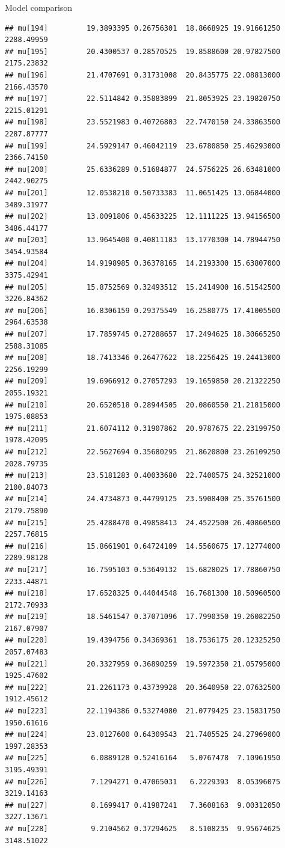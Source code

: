 \documentclass[
  ignorenonframetext,
]{beamer}
\begin{document}
\begin{frame}[fragile]{Model comparison}
\begin{verbatim}
## mu[194]         19.3893395 0.26756301  18.8668925 19.91661250 2288.49959
## mu[195]         20.4300537 0.28570525  19.8588600 20.97827500 2175.23832
## mu[196]         21.4707691 0.31731008  20.8435775 22.08813000 2166.43570
## mu[197]         22.5114842 0.35883899  21.8053925 23.19820750 2215.01291
## mu[198]         23.5521983 0.40726803  22.7470150 24.33863500 2287.87777
## mu[199]         24.5929147 0.46042119  23.6780850 25.46293000 2366.74150
## mu[200]         25.6336289 0.51684877  24.5756225 26.63481000 2442.90275
## mu[201]         12.0538210 0.50733383  11.0651425 13.06844000 3489.31977
## mu[202]         13.0091806 0.45633225  12.1111225 13.94156500 3486.44177
## mu[203]         13.9645400 0.40811183  13.1770300 14.78944750 3454.93584
## mu[204]         14.9198985 0.36378165  14.2193300 15.63807000 3375.42941
## mu[205]         15.8752569 0.32493512  15.2414900 16.51542500 3226.84362
## mu[206]         16.8306159 0.29375549  16.2580775 17.41005500 2964.63538
## mu[207]         17.7859745 0.27288657  17.2494625 18.30665250 2588.31085
## mu[208]         18.7413346 0.26477622  18.2256425 19.24413000 2256.19299
## mu[209]         19.6966912 0.27057293  19.1659850 20.21322250 2055.19321
## mu[210]         20.6520518 0.28944505  20.0860550 21.21815000 1975.08853
## mu[211]         21.6074112 0.31907862  20.9787675 22.23199750 1978.42095
## mu[212]         22.5627694 0.35680295  21.8620800 23.26109250 2028.79735
## mu[213]         23.5181283 0.40033680  22.7400575 24.32521000 2100.84073
## mu[214]         24.4734873 0.44799125  23.5908400 25.35761500 2179.75890
## mu[215]         25.4288470 0.49858413  24.4522500 26.40860500 2257.76815
## mu[216]         15.8661901 0.64724109  14.5560675 17.12774000 2289.98128
## mu[217]         16.7595103 0.53649132  15.6828025 17.78860750 2233.44871
## mu[218]         17.6528325 0.44044548  16.7681300 18.50960500 2172.70933
## mu[219]         18.5461547 0.37071096  17.7990350 19.26082250 2167.07907
## mu[220]         19.4394756 0.34369361  18.7536175 20.12325250 2057.07483
## mu[221]         20.3327959 0.36890259  19.5972350 21.05795000 1925.47602
## mu[222]         21.2261173 0.43739928  20.3640950 22.07632500 1912.45612
## mu[223]         22.1194386 0.53274080  21.0779425 23.15831750 1950.61616
## mu[224]         23.0127600 0.64309543  21.7405525 24.27969000 1997.28353
## mu[225]          6.0889128 0.52416164   5.0767478  7.10961950 3195.49391
## mu[226]          7.1294271 0.47065031   6.2229393  8.05396075 3219.14163
## mu[227]          8.1699417 0.41987241   7.3608163  9.00312050 3227.13671
## mu[228]          9.2104562 0.37294625   8.5108235  9.95674625 3148.51022

\end{verbatim}
\end{frame}
\end{document}
